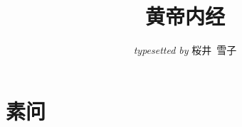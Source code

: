 \documentclass{ctexart}
\title{黄帝内经}
\author{\textit{typesetted by} 桜井\ 雪子}
\date{}
\begin{document}
\maketitle
\tableofcontents

\section{素问}



\end{document}
